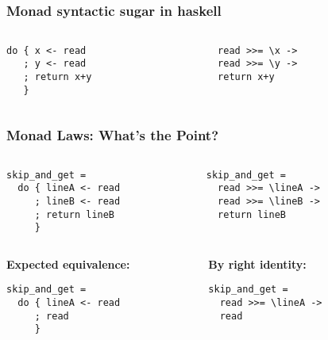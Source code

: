 \documentclass{beamer}
\begin{document}
\subsection{} 
\begin{frame}[fragile]
\frametitle{Monad syntactic sugar in haskell}
\begin{columns}[t]
  \begin{column}{5cm}
\begin{lstlisting}
do { x <- read
   ; y <- read
   ; return x+y
   }
\end{lstlisting}
  \end{column}
  \begin{column}{5cm}
\begin{lstlisting}
    read >>= \x ->    
    read >>= \y ->    
    return x+y
\end{lstlisting}
  \end{column}
\end{columns}

\end{frame}
\begin{frame}[fragile]
\frametitle{Monad Laws: What's the Point?}		
\begin{columns}[t]
{
  \begin{column}{5cm}  
\begin{lstlisting}
skip_and_get = 
  do { lineA <- read
     ; lineB <- read 
     ; return lineB 
     }
\end{lstlisting}
  \end{column}  
  }  
{  
  \begin{column}{5cm}
\begin{lstlisting}
skip_and_get =
  read >>= \lineA ->    
  read >>= \lineB ->    
  return lineB
\end{lstlisting}
  \end{column}
  }
\end{columns}
\begin{columns}[t]
{
  \begin{column}{5cm}
  \textbf{Expected equivalence:}
\begin{lstlisting}
skip_and_get = 
  do { lineA <- read
     ; read
     }
\end{lstlisting}
  \end{column}
  }
  {
  \begin{column}{5cm}
    \textbf{By right identity:}
\begin{lstlisting}
skip_and_get =
  read >>= \lineA ->    
  read
\end{lstlisting}
  \end{column}
  }
\end{columns}
\end{frame}
\end{document}
